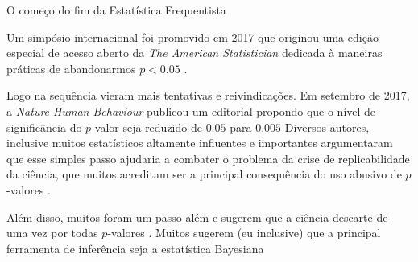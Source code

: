 \begin{frame}{O começo do fim da Estatística Frequentista}
	\begin{vfilleditems}
		\small
		\item Um simpósio internacional foi promovido em 2017 que originou uma edição especial de acesso aberto da
		\textit{The American Statistician} dedicada à maneiras práticas de abandonarmos $p < 0.05$
		\parencite{wassersteinMovingWorld052019}.
		\item Logo na sequência vieram mais tentativas e reivindicações.
		Em setembro de 2017, a \textit{Nature Human Behaviour} publicou um editorial propondo que o nível de
		significância do $p$-valor seja reduzido de $0.05$ para $0.005$ \parencite{benjaminRedefineStatisticalSignificance2018}
		Diversos autores, inclusive muitos estatísticos altamente influentes e importantes argumentaram que esse simples passo
		ajudaria a combater o problema da crise de replicabilidade da ciência, que muitos acreditam ser a principal
		consequência do uso abusivo de $p$-valores \parencite{Ioannidis2019}.
		\item Além disso, muitos foram um passo além e sugerem que a ciência descarte de uma vez por todas $p$-valores
		\parencite{ItTimeTalk2019,lakensJustifyYourAlpha2018}. Muitos sugerem (eu inclusive) que a principal ferramenta
		de inferência seja a estatística Bayesiana \parencite{amrheinScientistsRiseStatistical2019, Goodman1180, vandeschootBayesianStatisticsModelling2021}
	\end{vfilleditems}
\end{frame}
